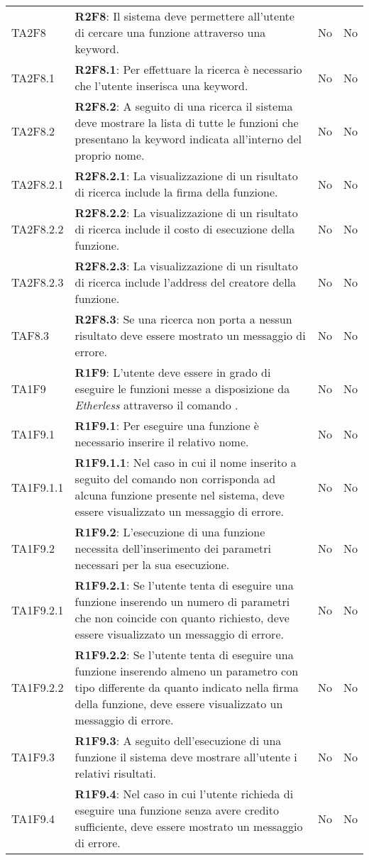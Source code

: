\begin{longtable}{
		>{\centering}p{} 
		>{}p{}
		>{\centering}p{}
		>{\centering}p{} }
	TA2F8 		& \textbf{R2F8}: Il sistema deve permettere all'utente di cercare una funzione attraverso una keyword. 																					& No & No \tabularnewline
	TA2F8.1 		& \textbf{R2F8.1}: Per effettuare la ricerca è necessario che l'utente inserisca una keyword. 																							& No & No \tabularnewline
	TA2F8.2 		& \textbf{R2F8.2}: A seguito di una ricerca il sistema deve mostrare la lista di	tutte le funzioni che presentano la keyword indicata all'interno del proprio nome.						& No & No \tabularnewline
	TA2F8.2.1 	& \textbf{R2F8.2.1}: La visualizzazione di un risultato di ricerca include	la firma della funzione.																						& No & No \tabularnewline
	TA2F8.2.2 	& \textbf{R2F8.2.2}: La visualizzazione di un risultato di ricerca include	il costo di esecuzione della funzione.																			& No & No \tabularnewline
	TA2F8.2.3 	& \textbf{R2F8.2.3}: La visualizzazione di un risultato di ricerca include l'address del creatore della funzione.																			& No & No \tabularnewline
	TAF8.3 		& \textbf{R2F8.3}: Se una ricerca non porta a nessun risultato deve essere mostrato un messaggio di errore. 																				& No & No \tabularnewline

	TA1F9 		& \textbf{R1F9}: L'utente deve essere in grado di eseguire le funzioni messe a disposizione da \textit{Etherless} attraverso il comando \run{}.											& No & No \tabularnewline
	TA1F9.1 		& \textbf{R1F9.1}: Per eseguire una funzione è necessario inserire il relativo nome. 																										& No & No \tabularnewline
	TA1F9.1.1 	& \textbf{R1F9.1.1}: Nel caso in cui il nome inserito a seguito del comando \run{} non corrisponda ad alcuna funzione presente nel sistema, deve essere visualizzato un messaggio di errore. & No & No \tabularnewline
	TA1F9.2 		& \textbf{R1F9.2}: L'esecuzione di una funzione necessita dell'inserimento dei parametri necessari per la sua esecuzione.																	& No & No \tabularnewline
	TA1F9.2.1	& \textbf{R1F9.2.1}: Se l'utente tenta di eseguire una funzione inserendo un numero di parametri che non coincide con quanto richiesto, deve essere visualizzato un messaggio di errore. 	& No & No \tabularnewline
	TA1F9.2.2 	& \textbf{R1F9.2.2}: Se l'utente tenta di eseguire una funzione inserendo almeno un parametro con tipo differente da quanto indicato nella firma della funzione, deve essere visualizzato un messaggio di errore. & No & No \tabularnewline
	TA1F9.3 		& \textbf{R1F9.3}: A seguito dell'esecuzione di una funzione il sistema deve mostrare all'utente i relativi risultati. 																	& No & No \tabularnewline
	TA1F9.4 		& \textbf{R1F9.4}: Nel caso in cui l'utente richieda di eseguire una funzione senza avere credito sufficiente, deve essere mostrato un messaggio di errore.								& No & No \tabularnewline


\end{longtable}
